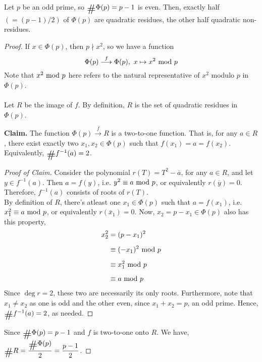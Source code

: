 \begin{proposition}
Let $p$ be an odd prime, so $\card\Phi(p) = p-1$ is even. Then, exactly half $(=(p-1)/2)$ of $\Phi(p)$ are quadratic residues, the other half quadratic non-residues.
\end{proposition}
\begin{proof}
If $x \in \Phi(p)$, then $p\nmid x^2$, so we have a function
\[\Phi(p) \overset{f}{\longrightarrow} \Phi(p),\ x \mapsto x^2\text{ mod }{p}\]
Note that $x^2\text{ mod }{p}$ here refers to the natural representative of $x^2$ modulo $p$ in $\Phi(p)$.\\
\\
Let $R$ be the image of $f$. By definition, $R$ is the set of quadratic residues in $\Phi(p)$.\\
\begin{subproof}
\vspace*{-0.1in}
{\bf Claim.} The function $\Phi(p) \overset{f}{\longrightarrow} R$ is a two-to-one function. That is, for any $a \in R$, there exist exactly two $x_1,x_2 \in \Phi(p)$ such that $f(x_1) = a = f(x_2)$. Equivalently, $\card{f^{-1}(a)} = 2$.
\begin{proof}[Proof of Claim]
Consider the polynomial $r(T) = T^2 - \overline{a}$, for any $a \in R$, and let $y \in f^{-1}(a)$. Then $a = f(y)$, i.e. $y^2 \equiv a\text{ mod }{p}$, or equivalently $r(\overline{y}) = 0$. Therefore, $f^{-1}(a)$ consists of roots of $r(T)$.\\[0.5em]
By definition of $R$, there's atleast one $x_1 \in \Phi(p)$ such that $a = f(x_1)$, i.e. $x_1^2 \equiv a \text{ mod }{p}$, or equivalently $r(\overline{x}_1) = 0$. Now, $x_2 = p-x_1 \in \Phi(p)$ also has this property,
\begin{align*}
x_2^2 &= (p-x_1)^2\\[0.5em]
&\equiv (-x_1)^2 \text{ mod }{p}\\[0.5em]
&\equiv x_1^2\text{ mod }{p}\\[0.5em]
&\equiv a\text{ mod }{p}
\end{align*}
Since $\deg r = 2$, these two are necessarily its only roots. Furthermore, note that $x_1 \neq x_2$ as one is odd and the other even, since $x_1 + x_2 = p$, an odd prime. Hence, $\card{f^{-1}(a)} = 2$, as needed. 
\end{proof}
\vspace*{0.05ex}
\end{subproof}
\vspace*{1em}
Since $\card\Phi(p) = p-1$ and $f$ is two-to-one onto $R$. We have, $\card{R} = \dfrac{\card{\Phi(p)}}{2} = \dfrac{p-1}{2}$.
\end{proof}

